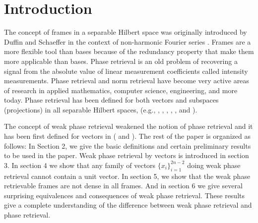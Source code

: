 \section{Introduction}\label{s:intro}
The concept of frames in a separable Hilbert space was originally introduced by Duffin and Schaeffer in the context of non-harmonic Fourier series \cite{DS1952}.
Frames are a more flexible tool than bases because of  the redundancy property that make them more applicable than bases.
 Phase retrieval is an old problem of recovering a signal from the absolute value of linear measurement coefficients called intensity measurements.
 Phase retrieval and norm retrieval have become very active areas of research in applied mathematics, computer science, engineering, and more today. Phase retrieval has been defined for both vectors and subspaces (projections) in all separable Hilbert spaces, (e.g., \cite{CCJW14}, \cite{BCE2006}, \cite{BCCHT18}, \cite{ACCHTTX17}, \cite{CCD16}, \cite{CCPW13} and \cite{CGJT17}).
\par
The concept of weak phase retrieval weakened the notion of phase retrieval and it has been first defined for vectors in (\cite{ACNT2015} and \cite{ACGJT2016}). 
 The rest of the paper is organized as follows: In Section 2, we give the basic
definitions and certain preliminary results to be used in the paper. Weak
phase retrieval by vectors is introduced in section 3. 
In section 4 we show that any family of vectors $\{x_i\}_{i=1}^{2n-2}$ doing weak phase retrieval cannot contain a unit vector. 
In section 5, we show that the weak phase retrievable frames are not dense in all frames. And in section 6
we give several surprising equivalences and consequences of weak phase retrieval. These results give a complete understanding
of the difference between weak phase retrieval and phase retrieval.


